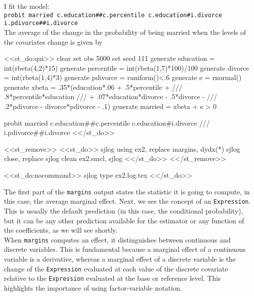 \documentclass[11pt]{article}
\begin{document}
I fit the model: \\

\texttt{probit married c.education\#\#c.percentile c.education\#i.divorce \\
\indent \indent i.pdivorce\#\#i.divorce} \\

The average of the change in the probability of being married when the levels of the covariates change is given by

<<st_do:qui>>
clear 
set obs 5000
set seed 111
generate education  = int(rbeta(4,2)*15)
generate percentile = int(rbeta(1,7)*100)/100
generate divorce    = int(rbeta(1,4)*3)
generate pdivorce   = runiform()<.6
generate e          = rnormal()
generate xbeta      = .35*(education*.06 + .5*percentile +   ///
                      .8*percentile*education                ///
                      + .07*education*divorce - .5*divorce -  ///
                      .2*pdivorce - divorce*pdivorce - .1)
generate married    = xbeta + e > 0 

probit married c.education##c.percentile c.education#i.divorce	///
	i.pdivorce##i.divorce 
<</st_do>>

<<st_remove>>
<<st_do>>
sjlog using ex2, replace 
margins, dydx(*)
sjlog close, replace 
sjlog clean ex2.smcl, sjlog 
<</st_do>>
<</st_remove>>

\begin{stlog}[auto]
<<st_do:nocommand>>
sjlog type ex2.log.tex
<</st_do>>
\end{stlog}

The first part of the \texttt{margins} output states the statistic it is going to compute, in this case, the average marginal effect. Next, we see the concept of an \texttt{Expression}. This is usually the default prediction (in this case, the conditional probability), but it can be any other prediction available for the estimator or any function of the coefficients, as we will see shortly.\\

When \texttt{margins} computes an effect, it distinguishes between continuous and discrete variables. This is fundamental because a marginal effect of a continuous variable is a derivative, whereas a marginal effect of a discrete variable is the change of the \texttt{Expression}  evaluated at each value of the discrete covariate relative to the \texttt{Expression} evaluated at the base or reference level. This highlights the importance of using factor-variable notation.\\
\end{document}
